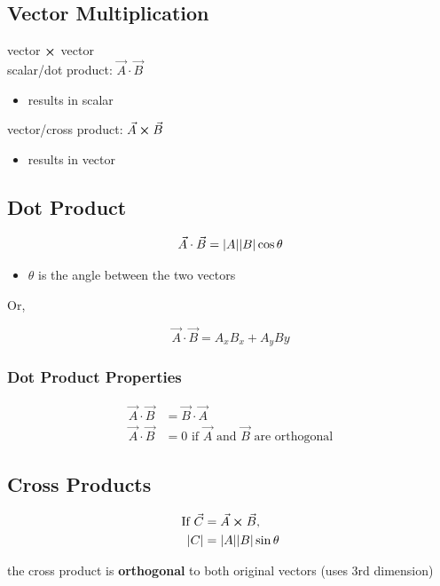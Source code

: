\documentclass[titlepage]{article}
\begin{document}
\subsection{Vector Multiplication}
vector $\cross$ vector\\

scalar/dot product: $\vec{A} \cdot \vec{B}$
\begin{itemize}
    \item results in scalar
\end{itemize}

vector/cross product: $\vec{A} \cross \vec{B}$
\begin{itemize}
    \item results in vector
\end{itemize}

\subsection{Dot Product}
\[
    \vec{A} \cdot \vec{B} = \abs{A} \abs{B} \cos \theta
\]

\begin{itemize}
    \item $\theta$ is the angle between the two vectors
\end{itemize}

Or,

\[ \vec{A} \cdot \vec{B} = A_xB_x + A_yBy \]

\subsubsection{Dot Product Properties}
\begin{align*}
    \vec{A} \cdot \vec{B} & = \vec{B} \cdot \vec{A}                               \\
    \vec{A} \cdot \vec{B} & = 0 \text{ if $\vec{A}$ and $\vec{B}$ are orthogonal}
\end{align*}

\subsection{Cross Products}
\begin{align*}
    \text{If } \vec{C} & = \vec{A} \cross \vec{B},     \\
    \abs{C}            & = \abs{A} \abs{B} \sin \theta
\end{align*}

the cross product is \textbf{orthogonal} to both original vectors (uses 3rd dimension)
\end{document}
